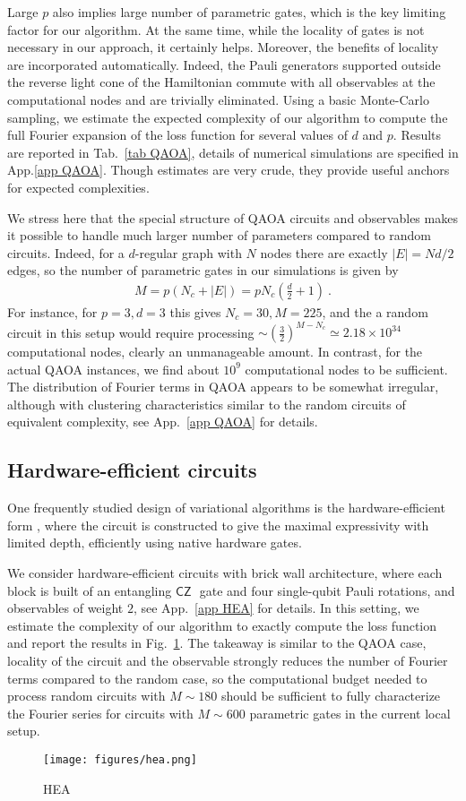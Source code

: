 \documentclass[twocolumn, amsfonts, amssymb, aps, nofootinbib]{revtex4-2}
\newcommand{\CZ}{\textsf{CZ }}
\begin{document}
Large $p$ also implies large number of parametric gates, which is the key limiting factor for our algorithm. At the same time, while the locality of gates is not necessary in our approach, it certainly helps. Moreover, the benefits of locality are incorporated automatically. Indeed, the Pauli generators supported outside the reverse light cone of the Hamiltonian commute with all observables at the computational nodes and are trivially eliminated. Using a basic Monte-Carlo sampling, we estimate the expected complexity of our algorithm to compute the full Fourier expansion of the loss function for several values of $d$ and $p$. Results are reported in Tab.~\ref{tab QAOA}, details of numerical simulations are specified in App.\ref{app QAOA}. Though estimates are very crude, they provide useful anchors for expected complexities.

We stress here that the special structure of QAOA circuits and observables makes it possible to handle much larger number of parameters compared to random circuits. Indeed, for a $d$-regular graph with $N$ nodes there are exactly $|E|=Nd/2$ edges, so the number of parametric gates in our simulations is given by
\begin{align}
	M=p(N_c+|E|)=pN_c\left(\frac{d}{2}+1\right) \ .
\end{align}
For instance, for $p=3, d=3$ this gives $N_c=30, M=225$, and the a random circuit in this setup would require processing $\sim \left(\frac32\right)^{M-N_c}\simeq 2.18\times 10^{34}$ computational nodes, clearly an unmanageable amount. In contrast, for the actual QAOA instances, we find about $10^9$ computational nodes to be sufficient. The distribution of Fourier terms in QAOA appears to be somewhat irregular, although with clustering characteristics similar to the random circuits of equivalent complexity, see App.~\ref{app QAOA} for details.

\subsection{Hardware-efficient circuits}
One frequently studied design of variational algorithms is the hardware-efficient form \cite{Kandala2017}, where the circuit is constructed to give the maximal expressivity with limited depth, efficiently using native hardware gates. 

We consider hardware-efficient circuits with brick wall architecture, where each block is built of an entangling $\CZ$ gate and four single-qubit Pauli rotations, and observables of weight $2$, see App.~\ref{app HEA} for details. In this setting, we estimate the complexity of our algorithm to exactly compute the loss function and report the results in Fig.~\ref{fig HEA}. The takeaway is similar to the QAOA case, locality of the circuit and the observable strongly reduces the number of Fourier terms compared to the random case, so the computational budget needed to process random circuits with $M\sim 180$ should be sufficient to fully characterize the Fourier series for circuits with $M\sim600$ parametric gates in the current local setup.
\begin{figure}
	\texttt{[image: figures/hea.png]}
	\caption{HEA}
	\label{fig HEA}
\end{figure}
\end{document}
